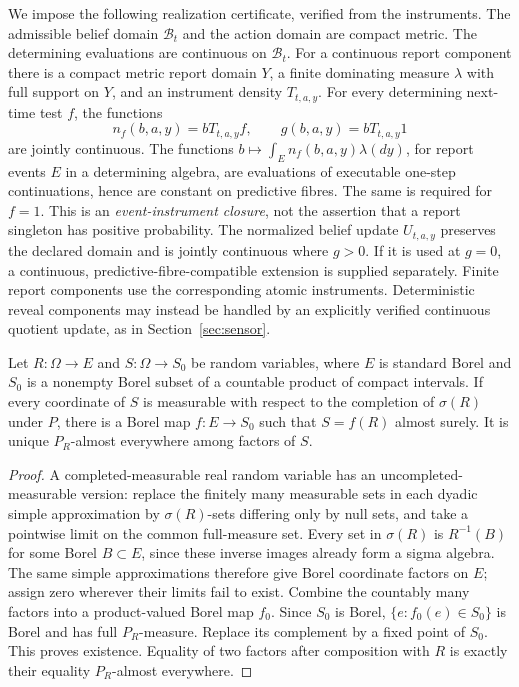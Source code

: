 We impose the following realization certificate, verified from the instruments. The admissible belief domain $\mathcal B_t$ and the action domain are compact metric. The determining evaluations are continuous on $\mathcal B_t$. For a continuous report component there is a compact metric report domain $Y$, a finite dominating measure $\lambda$ with full support on $Y$, and an instrument density $T_{t,a,y}$. For every determining next-time test $f$, the functions
\begin{equation}\label{eq:density-pullback}
 n_f(b,a,y)=bT_{t,a,y}f,\qquad g(b,a,y)=bT_{t,a,y}1
\end{equation}
are jointly continuous. The functions $b\mapsto\int_E n_f(b,a,y)\lambda(dy)$, for report events $E$ in a determining algebra, are evaluations of executable one-step continuations, hence are constant on predictive fibres. The same is required for $f=1$. This is an \emph{event-instrument closure}, not the assertion that a report singleton has positive probability. The normalized belief update $U_{t,a,y}$ preserves the declared domain and is jointly continuous where $g>0$. If it is used at $g=0$, a continuous, predictive-fibre-compatible extension is supplied separately. Finite report components use the corresponding atomic instruments. Deterministic reveal components may instead be handled by an explicitly verified continuous quotient update, as in Section~\ref{sec:sensor}.

\begin{lemma}\label{lem:factor}
Let $R:\Omega\to E$ and $S:\Omega\to S_0$ be random variables, where $E$ is standard Borel and $S_0$ is a nonempty Borel subset of a countable product of compact intervals. If every coordinate of $S$ is measurable with respect to the completion of $\sigma(R)$ under $P$, there is a Borel map $f:E\to S_0$ such that $S=f(R)$ almost surely. It is unique $P_R$-almost everywhere among factors of $S$.
\end{lemma}
\begin{proof}
A completed-measurable real random variable has an uncompleted-measurable version: replace the finitely many measurable sets in each dyadic simple approximation by $\sigma(R)$-sets differing only by null sets, and take a pointwise limit on the common full-measure set. Every set in $\sigma(R)$ is $R^{-1}(B)$ for some Borel $B\subset E$, since these inverse images already form a sigma algebra. The same simple approximations therefore give Borel coordinate factors on $E$; assign zero wherever their limits fail to exist. Combine the countably many factors into a product-valued Borel map $f_0$. Since $S_0$ is Borel, $\{e:f_0(e)\in S_0\}$ is Borel and has full $P_R$-measure. Replace its complement by a fixed point of $S_0$. This proves existence. Equality of two factors after composition with $R$ is exactly their equality $P_R$-almost everywhere.
\end{proof}

